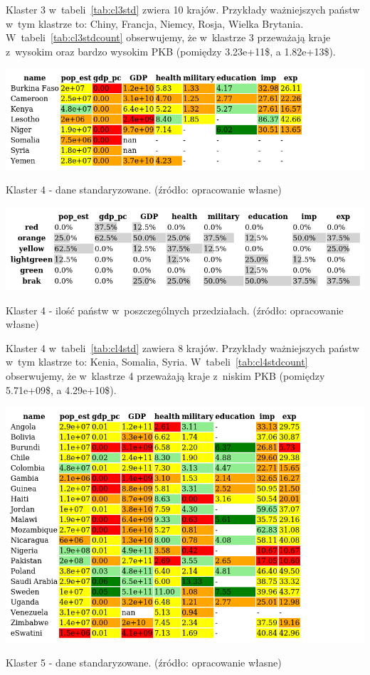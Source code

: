 \documentclass[11pt]{report}
\begin{document}
    Klaster 3 w~tabeli~\ref{tab:cl3std} zwiera 10 krajów.
    Przykłady ważniejszych państw w~tym klastrze to: Chiny, Francja, Niemcy, Rosja, Wielka Brytania.
    W~tabeli~\ref{tab:cl3stdcount} obserwujemy, że w~klastrze 3 przeważają kraje z~wysokim oraz bardzo wysokim PKB (pomiędzy 3.23e+11\$, a 1.82e+13\$).

    \begin{table}[!htp]
        \centering
        \includegraphics[width=\linewidth]{tables/CLUST/cluster4stdkmeans.png}
        \caption{Klaster 4 - dane standaryzowane. (źródło: opracowanie własne)}
        \label{tab:cl4std}
    \end{table}

    \begin{table}[!htp]
        \centering
        \includegraphics[width=\linewidth]{tables/CLUST/cluster4stdkmeanscount.png}
        \caption{Klaster 4 - ilość państw w~poszczególnych przedziałach. (źródło: opracowanie własne)}
        \label{tab:cl4stdcount}
    \end{table}

    Klaster 4 w~tabeli~\ref{tab:cl4std} zawiera 8 krajów.
    Przykłady ważniejszych państw w~tym klastrze to: Kenia, Somalia, Syria.
    W~tabeli~\ref{tab:cl4stdcount} obserwujemy, że w~klastrze 4 przeważają kraje z~niskim PKB (pomiędzy 5.71e+09\$, a 4.29e+10\$).

    \begin{table}[!htp]
        \centering
        \includegraphics[width=\linewidth]{tables/CLUST/cluster5stdkmeans.png}
        \caption{Klaster 5 - dane standaryzowane. (źródło: opracowanie własne)}
        \label{tab:cl5std}
    \end{table}
\end{document}
